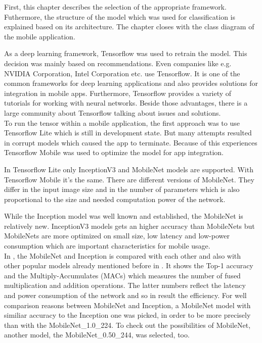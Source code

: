 First, this chapter describes the selection of the appropriate framework. Futhermore, the structure of the model which was used for classification is explained based on its architecture. The chapter closes with the class diagram of the mobile application.

As a deep learning framework, Tensorflow was used to retrain the model. This decision was mainly based on recommendations. Even companies like e.g. NVIDIA Corporation, Intel Corporation etc. use Tensorflow. It is one of the common frameworks for deep learning applications and also provides solutions for integration in mobile apps. Furthermore, Tensorflow provides a variety of tutorials for working with neural networks. Beside those advantages, there is a large community about Tensorflow talking about issues and solutions. \\

To run the tensor within a mobile application, the first approach was to use Tensorflow Lite which is still in development state. But many attempts resulted in corrupt models which caused the app to terminate. Because of this experiences Tensorflow Mobile was used to optimize the model for app integration. 
		
In Tensorflow Lite only InceptionV3 and MobileNet models are supported. With Tensorflow Mobile it's the same. There are different versions of MobileNet. They differ in the input image size and in the number of parameters which is also proportional to the size and needed computation power of the network.

While the Inception model was well known and established, the MobileNet is relatively new. InceptionV3 models gets an higher accuracy than MobileNets but MobileNets are more optimized on small size, low latency and low-power consumption which are important characteristics for mobile usage. \citep{TensorFlowMobileNet} \\


In , the MobileNet and Inception is compared with each other and also with other popular models already mentioned before in . It shows the Top-1 accuracy and the Multiply-Accumulates (MACs) which measures the number of fused multiplication and addition operations. The latter numbers reflect the latency and power consumption of the network and so in result the efficiency. For well comparison reasons between MobileNet and Inception, a MobileNet model with similiar accuracy to the Inception one was picked, in order to be more precisely than with the MobileNet\_1.0\_224. To check out the possibilities of MobileNet, another model, the MobileNet\_0.50\_244, was selected, too.

